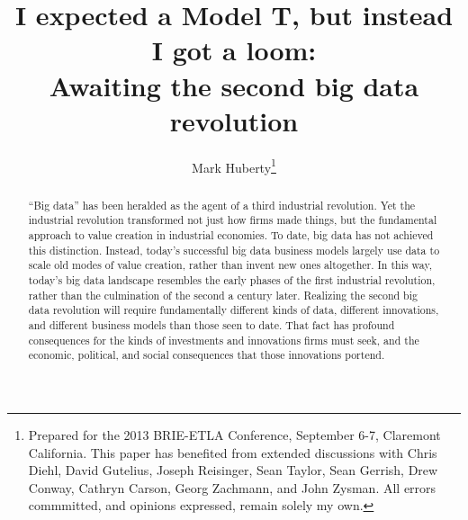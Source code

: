 \documentclass[12pt]{article}
\title{I expected a Model T, but instead I got a loom:\\ Awaiting the second big data revolution}
\author{Mark Huberty\thanks{Prepared for the 2013 BRIE-ETLA
    Conference, September 6-7, Claremont California. This paper has
    benefited from extended discussions with Chris Diehl, David
    Gutelius, Joseph Reisinger, Sean Taylor, Sean Gerrish, Drew
    Conway, Cathryn Carson, Georg Zachmann, and John
    Zysman. All errors commmitted, and opinions expressed, remain
    solely my own.}}
\begin{document}
\maketitle
\begin{abstract}
``Big data'' has been heralded as the agent of a third industrial
revolution. Yet the industrial revolution transformed not just how
firms made things, but the fundamental approach to value creation in
industrial economies. To date, big data has not achieved this
distinction. Instead, today's successful big data business models
largely use data to scale old modes of value creation, rather than
invent new ones altogether. In this way, today's big data landscape
resembles the early phases of the first industrial revolution, rather
than the culmination of the second a century later. Realizing the
second big data revolution will require fundamentally different kinds
of data, different innovations, and different business models than
those seen to date. That fact has profound consequences for the kinds
of investments and innovations firms must seek, and the economic,
political, and social consequences that those innovations portend.
\end{abstract}
\end{document}
